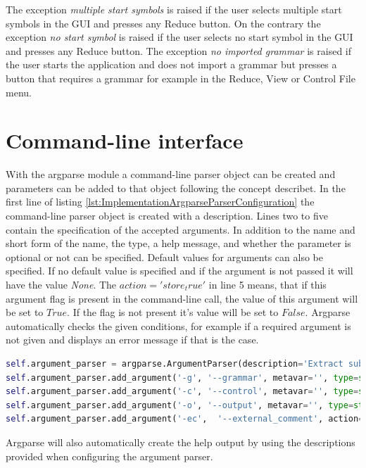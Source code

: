 The exception \textit{multiple start symbols} is raised if the user selects multiple start symbols in the GUI and presses any Reduce button. On the contrary the exception \textit{no start symbol} is raised if the user selects no start symbol in the GUI and presses any Reduce button. The exception \textit{no imported grammar} is raised if the user starts the application and does not import a grammar but presses a button that requires a grammar for example in the Reduce, View or Control File menu.

\section{Command-line interface}\label{sec:ImplementationCommandLineInterface}

With the argparse module a command-line parser object can be created and parameters can be added to that object following the concept describet.
In the first line of listing \ref{lst:ImplementationArgparseParserConfiguration} the command-line parser object is created with a description.
Lines two to five contain the specification of the accepted arguments.
In addition to the name and short form of the name, the type, a help message, and whether the parameter is optional or not can be specified.
Default values for arguments can also be specified.
If no default value is specified and if the argument is not passed it will have the value \textit{None}.
The $action = 'store_true'$ in line 5 means, that if this argument flag is present in the command-line call, the value of this argument will be set to $True$.
If the flag is not present it's value will be set to $False$.
Argparse automatically checks the given conditions, for example if a required argument is not given and displays an error message if that is the case.

\begin{lstlisting}[language=Python, basicstyle=\scriptsize	,caption= Argparse command-line parser configuration,label= lst:ImplementationArgparseParserConfiguration]
self.argument_parser = argparse.ArgumentParser(description='Extract sub-syntax using TPTP syntax file and a control file')
self.argument_parser.add_argument('-g', '--grammar', metavar='', type=str, required=True, help='path of the TPTP syntax file')
self.argument_parser.add_argument('-c', '--control', metavar='', type=str, required=True, help='path of the control file')
self.argument_parser.add_argument('-o', '--output', metavar='', type=str, required=False, help='optional output file name (default output.txt)', default= "output.txt")
self.argument_parser.add_argument('-ec',  '--external_comment', action='store_true', help="flag - include external comment syntax")
\end{lstlisting}

Argparse will also automatically create the help output by using the descriptions provided when configuring the argument parser.
